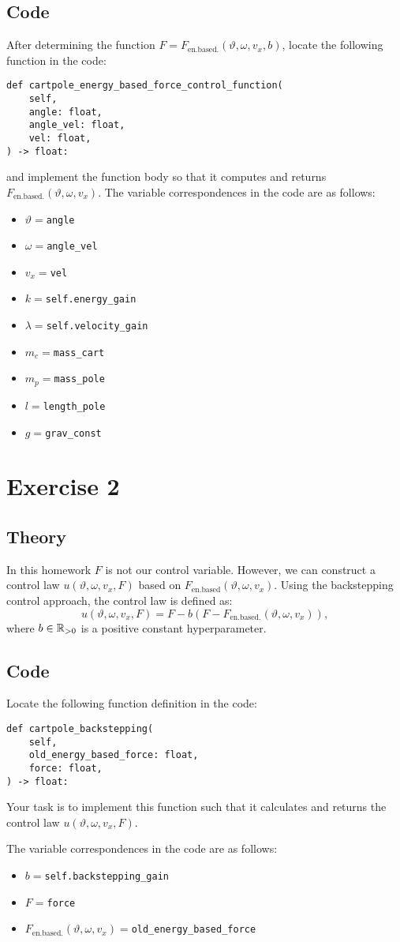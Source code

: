 \documentclass[12pt]{article}
\begin{document}
\subsection*{Code}
After determining the function $F =  F_{\text{en.based.}}(\vartheta, \omega, v_x, b)$, locate the following function in the code:
\begin{verbatim}
def cartpole_energy_based_force_control_function(
    self,
    angle: float, 
    angle_vel: float, 
    vel: float, 
) -> float:
\end{verbatim}
and implement the function body so that it computes and returns $F_{\text{en.based.}}(\vartheta, \omega, v_x)$. 
The variable correspondences in the code are as follows:
\begin{itemize}
    \item $\vartheta=$\texttt{angle}
    \item $\omega=$\texttt{angle\_vel}
    \item $v_x=$\texttt{vel}
    \item $k=$\texttt{self.energy\_gain}
    \item $\lambda=$\texttt{self.velocity\_gain}
    \item $m_c=$\texttt{mass\_cart}
    \item $m_p=$\texttt{mass\_pole}
    \item $l=$\texttt{length\_pole}
    \item $g=$\texttt{grav\_const}
\end{itemize}

\section*{Exercise 2}

\subsection*{Theory}
In this homework $F$ is not our control variable.
However, we can construct a control law $u(\vartheta, \omega, v_x, F)$ based on $F_{\text{en.based}}(\vartheta, \omega, v_x)$. 
Using the backstepping control approach, the control law is defined as:
$$
u(\vartheta, \omega, v_x, F) = F - b(F - F_{\text{en.based.}}(\vartheta, \omega, v_x)), 
$$
where $b \in {\mathbb{R}}_{> 0}$ is a positive constant hyperparameter.


\subsection*{Code}
Locate the following function definition in the code:
\begin{verbatim}
def cartpole_backstepping(
    self,
    old_energy_based_force: float,
    force: float, 
) -> float:
\end{verbatim}
Your task is to implement this function such that it calculates and returns the control law $u(\vartheta, \omega, v_x, F)$.

The variable correspondences in the code are as follows:
\begin{itemize}
    \item $b=$\texttt{self.backstepping\_gain}
    \item $F=$\texttt{force}
    \item $F_{\text{en.based.}}(\vartheta, \omega, v_x)=$\texttt{old\_energy\_based\_force}
\end{itemize}
\end{document}
